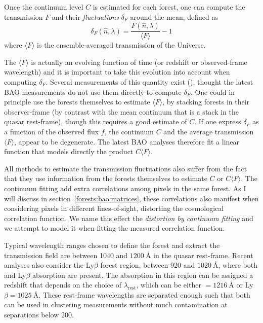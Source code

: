 Once the continuum level $C$ is estimated for each forest, one can compute 
the transmission $F$ and their \emph{fluctuations} $\delta_F$ around the mean,
defined as 
\begin{equation}
\delta_F(\hat{n}, \lambda) = \frac{F(\hat{n}, \lambda)}{\langle F \rangle} - 1
\label{eq:delta_transmission}
\end{equation}
where $\langle F \rangle$ is the ensemble-averaged transmission of the Universe. 

The $\langle F \rangle$ is actually an evolving function of time (or redshift or observed-frame 
wavelength) and it is important to take this evolution into account when computing 
$\delta_F$. 
Several measurements of this quantity exist 
(\cite{faucher-giguereDirectPrecisionMeasurement2008,
parisPrincipalComponentAnalysis2011,
beckerRefinedMeasurementMean2013,
kambleMeasurementsEffectiveOptical2020}), thought the latest BAO measurements do not 
use them directly to compute $\delta_F$. One could in principle use the forests themselves
to estimate $\langle F \rangle$, by stacking forests in their observer-frame 
(by contrast with the mean continuum that is a stack in the quasar rest-frame), 
though this requires a good estimate of $C$. 
If one express $\delta_F$ as a function of 
the observed flux $f$, the continuum $C$ and the average transmission $\langle F \rangle$,
appear to be degenerate. 
The latest BAO analyses therefore fit a linear function 
that models directly the product $C \langle F \rangle$. 

All methods to estimate the transmission fluctuations also suffer from the fact 
that they use information from the forests themselves to estimate $C$ or $C \langle F \rangle$.
The continuum fitting add extra correlations among pixels in the same forest. 
As I will discuss in section~\ref{forests:bao:matrices},
these correlations also manifest when considering pixels in different lines-of-sight, 
distorting the cosmological correlation function. 
We name this effect the \emph{distortion by continuum fitting} 
and we attempt to model it when fitting the measured correlation function.

Typical wavelength ranges chosen to define the \lya forest and extract the transmission field
are between 1040 and $\qty{1200}{\angstrom}$ in the quasar rest-frame. 
Recent analyses also consider the Ly$\beta$ forest region, between 920 and $\qty{1020}{\angstrom}$, 
where both \lya and Ly$\beta$ absorption are present. The absorption in this region 
can be assigned a redshift that depends on the choice of $\lambda_\mathrm{rest}$, 
which can be either \lya$ = \qty{1216}{\angstrom}$  or Ly$\beta = \qty{1025}{\angstrom}$. 
These rest-frame wavelengths are separated enough such that both can be used 
in clustering measurements without much contamination at separations below 200\hmpc.

